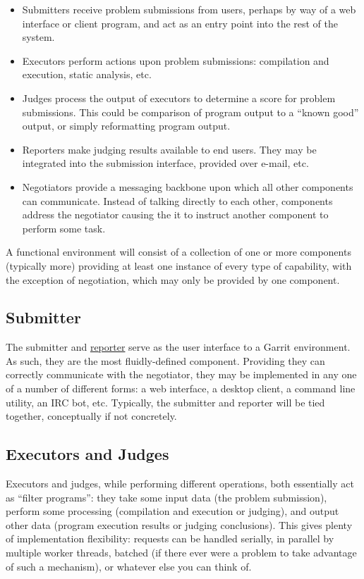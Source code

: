 \documentclass[11pt,letterpaper]{article}
\begin{document}
\begin{itemize}
\item Submitters receive problem submissions from users, perhaps by way of a
web interface or client program, and act as an entry point into the rest of the
system.
\item Executors perform actions upon problem submissions: compilation and
execution, static analysis, etc.
\item Judges process the output of executors to determine a score for problem
submissions. This could be comparison of program output to a ``known good''
output, or simply reformatting program output.
\item Reporters make judging results available to end users. They may be
integrated into the submission interface, provided over e-mail, etc.
\item Negotiators provide a messaging backbone upon which all other components
can communicate. Instead of talking directly to each other, components address
the negotiator causing the it to instruct another component to perform some
task.
\end{itemize}

A functional environment will consist of a collection of one or more components
(typically more) providing at least one instance of every type of capability,
with the exception of negotiation, which may only be provided by one component.

\subsection{Submitter}
\label{design-submitter}

The submitter and \hyperref[design-reporter]{reporter} serve as the user
interface to a Garrit environment. As such, they are the most fluidly-defined
component. Providing they can correctly communicate with the negotiator, they
may be implemented in any one of a number of different forms: a web interface,
a desktop client, a command line utility, an IRC bot, etc. Typically, the
submitter and reporter will be tied together, conceptually if not concretely.

\subsection{Executors and Judges}
\label{design-executor-judge}

Executors and judges, while performing different operations, both essentially
act as ``filter programs'': they take some input data (the problem submission),
perform some processing (compilation and execution or judging), and output
other data (program execution results or judging conclusions). This gives
plenty of implementation flexibility: requests can be handled serially, in
parallel by multiple worker threads, batched (if there ever were a problem
to take advantage of such a mechanism), or whatever else you can think of.
\end{document}
